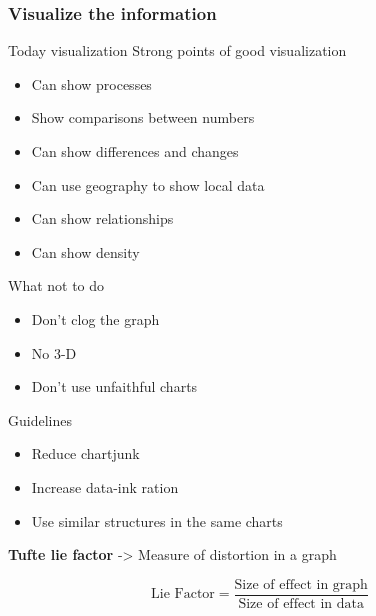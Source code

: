 \subsubsection{Visualize the information}

Today visualization
\vspace{10pt}
Strong points of good visualization

\begin{itemize}
    \item Can show processes
    \item Show comparisons between numbers
    \item Can show differences and changes
    \item Can use geography to show local data
    \item Can show relationships
    \item Can show density
\end{itemize}

\vspace{10pt}

What not to do

\begin{itemize}
    \item Don't clog the graph
    \item No 3-D
    \item Don't use unfaithful charts
\end{itemize}

\vspace{10pt}

Guidelines

\begin{itemize}
    \item Reduce chartjunk
    \item Increase data-ink ration
    \item Use similar structures in the same charts
\end{itemize}

\vspace{10pt}

\textbf{Tufte lie factor} -> Measure of distortion in a graph

\begin{equation}
    \text{Lie Factor} = 
    \frac{\text{Size of effect in graph}}
         {\text{Size of effect in data}}
\end{equation}

\vspace{10pt}

